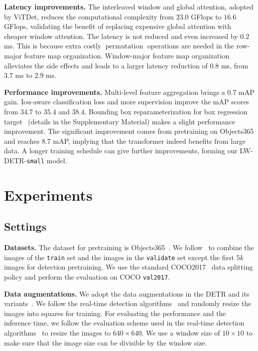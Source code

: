 \documentclass[runningheads]{llncs}
\begin{document}
\vspace{1mm}
\noindent\textbf{Latency improvements.} The interleaved window and global attention, adopted by ViTDet, reduces the computational complexity from $23.0$ GFlops to $16.6$ GFlops, validating the benefit of replacing expensive global attention with cheaper window attention. The latency is not reduced and even increased by $0.2$ ms. This is because extra costly $\operatorname{permutation}$ operations are needed in the row-major feature map organization. Window-major feature map organization alleviates the side effects and leads to a larger latency reduction of $0.8$ ms, from $3.7$ ms to $2.9$ ms.

\vspace{1mm}
\noindent\textbf{Performance improvements.} Multi-level feature aggregation brings a $0.7$ mAP gain. Iou-aware classification loss and more supervision improve the mAP scores from $34.7$ to $35.4$ and $38.4$. Bounding box reparameterization for box regression target~\cite{lin2023detr} (details in the Supplementary Material) makes a slight performance improvement. The significant improvement comes from pretraining on Objects365 and reaches $8.7$ mAP, implying that the transformer indeed benefits from large data. A longer training schedule can give further improvements, forming our LW-DETR-\texttt{small} model.

\section{Experiments}
\subsection{Settings}
\noindent\textbf{Datasets.} 
The dataset for pretraining is Objects365~\cite{shao2019objects365}. We follow~\cite{zhang2022dino,chen2022group} to combine the images of the \texttt{train} set and the images in the \texttt{validate} set except the first $5k$ images for detection pretraining. We use the standard COCO2017~\cite{lin2014microsoft} data splitting policy and perform the evaluation on COCO \texttt{val2017}.

\vspace{1mm}
\noindent\textbf{Data augmentations.} 
We adopt the data augmentations in the DETR and its variants~\cite{carion2020end,zhu2020deformable}. We follow the real-time detection algorithms~\cite{supergradients,yolov8_ultralytics,lyu2022rtmdet} and randomly resize the images into squares for training. For evaluating the performance and the inference time, we follow the evaluation scheme used in the real-time detection algorithms~\cite{supergradients,yolov8_ultralytics,lyu2022rtmdet} to resize the images to $640\times 640$. We use a window size of $10\times 10$ to make sure that the image size can be divisible by the window size.
\end{document}
